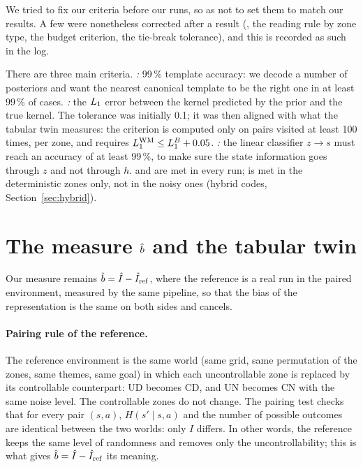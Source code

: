 \documentclass[10pt]{article}
\begin{document}
We tried to fix our criteria before our runs, so as not to set them to match our results.
A few were nonetheless corrected after a result (\Ks, the reading rule by zone type, the budget criterion, the tie-break
tolerance), and this is recorded as such in the log.

There are three main criteria.
\emph{\Ca:} 99\,\% template accuracy: we decode a number of posteriors and want the nearest canonical template to be %
the right one in at least 99\,\% of cases. %
\emph{\Cb:} the $L_{1}$ error between the kernel predicted by the prior and the true kernel.
The tolerance was initially 0.1; it was then aligned with what the tabular twin measures: the criterion is computed %
only on pairs visited at least 100 times, per zone, and requires $L_{1}^{\mathrm{WM}} \leq L_{1}^{B} + 0.05$. %
\emph{\Cc:} the linear classifier $z \to s$ must reach an accuracy of at least 99\,\%, to make sure the state %
information goes through $z$ and not through $h$.
\Ca{} and \Cc{} are met in every run; \Cb{} is met in the deterministic zones only, not in the noisy ones (hybrid
codes, Section~\ref{sec:hybrid}).

\section{The measure $\hat{b}$ and the tabular twin}
\label{sec:b}

Our measure remains $\hat{b} = \hat{I} - \hat{I}_{\mathrm{ref}}$, where the reference is a real run in the paired environment, measured by
the same pipeline, so that the bias of the representation is the same on both sides and cancels.

\paragraph{Pairing rule of the reference.}
The reference environment is the same world (same grid, same permutation of the zones, same themes, same goal) in which
each uncontrollable zone is replaced by its controllable counterpart: UD becomes CD, and UN becomes CN with the same noise
level. The controllable zones do not change.
The pairing test checks that for every pair $(s, a)$, $H(s' \mid s, a)$ and the number of possible outcomes are identical
between the two worlds: only $I$ differs.
In other words, the reference keeps the same level of randomness and removes only the uncontrollability; this is what
gives $\hat{b} = \hat{I} - \hat{I}_{\mathrm{ref}}$ its meaning.
\end{document}
